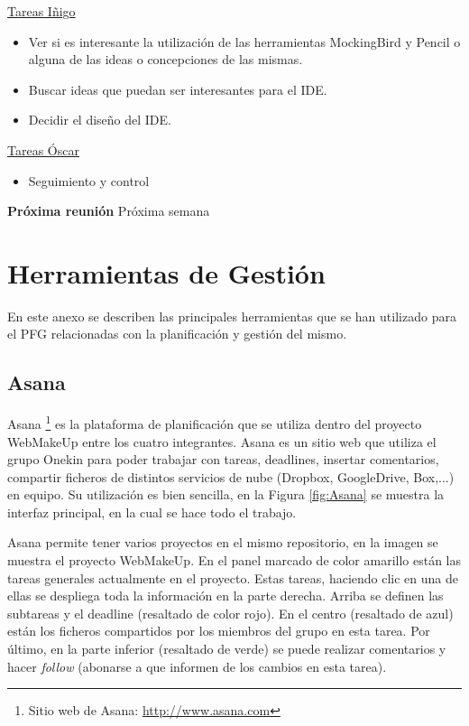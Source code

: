 \underline{Tareas Iñigo}

\begin{itemize}
\itemsep1pt\parskip0pt
\item
  Ver si es interesante la utilización de las herramientas MockingBird y Pencil o alguna de las ideas o concepciones de las mismas.
\item
  Buscar ideas que puedan ser interesantes para el IDE.
\item
  Decidir el diseño del IDE.
\end{itemize}

\underline{Tareas Óscar}

\begin{itemize}
\itemsep1pt\parskip0pt
\item
  Seguimiento y control
\end{itemize}

\textbf{Próxima reunión}
Próxima semana


\chapter{Herramientas de Gestión}
\label{sec:HerramientasGestion}

En este anexo se describen las principales herramientas que se han utilizado para el PFG relacionadas con la planificación y gestión del mismo.

\section{Asana}
\label{sec:Asana}

Asana \footnote{Sitio web de Asana: \url{http://www.asana.com}} es la plataforma de planificación que se utiliza dentro del proyecto WebMakeUp entre los cuatro integrantes. Asana es un sitio web que utiliza el grupo Onekin para poder trabajar con tareas, deadlines, insertar comentarios, compartir ficheros de distintos servicios de nube (Dropbox, GoogleDrive, Box,...) en equipo. Su utilización es bien sencilla, en la Figura \ref{fig:Asana} se muestra la interfaz principal, en la cual se hace todo el trabajo. 

Asana permite tener varios proyectos en el mismo repositorio, en la imagen se muestra el proyecto WebMakeUp. En el panel marcado de color amarillo están las tareas generales actualmente en el proyecto. Estas tareas, haciendo clic en una de ellas se despliega toda la información en la parte derecha. Arriba se definen las subtareas y el deadline (resaltado de color rojo). En el centro (resaltado de azul) están los ficheros compartidos por los miembros del grupo en esta tarea. Por último, en la parte inferior (resaltado de verde) se puede realizar comentarios y hacer \emph{follow} (abonarse a que informen de los cambios en esta tarea).

